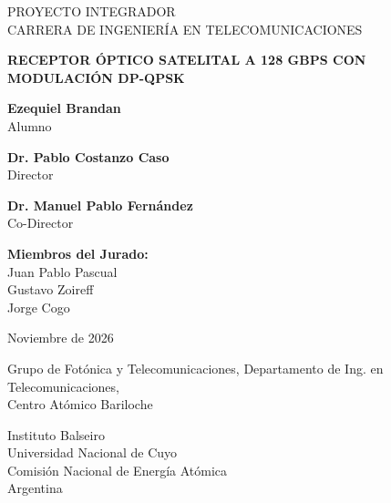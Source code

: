 %
\begin{titlepage}
\centering
\setlength{\parskip}{0pt}
\vspace*{1cm}

{\large PROYECTO INTEGRADOR}\\[0.3cm]
{\large CARRERA DE INGENIER\'IA EN TELECOMUNICACIONES}


{\LARGE\bfseries RECEPTOR \'OPTICO SATELITAL A 128 GBPS CON MODULACI\'ON DP-QPSK\\}


{\large\bfseries Ezequiel Brandan}\\
{\normalsize Alumno}


\begin{minipage}{0.45\textwidth}\centering
{\bfseries {Dr. Pablo Costanzo Caso}}\\
Director
\end{minipage}
\begin{minipage}{0.45\textwidth}\centering
{\bfseries {Dr. Manuel Pablo Fern\'andez}}\\
Co-Director
\end{minipage}


{\bfseries Miembros del Jurado:}\\
{Juan Pablo Pascual}\\
{Gustavo Zoireff}\\
{Jorge Cogo}


{\normalsize Noviembre de 2026}


{\normalsize Grupo de Fot\'onica y Telecomunicaciones, Departamento de Ing. en Telecomunicaciones,\\
Centro At\'omico Bariloche}


{\normalsize Instituto Balseiro\\
Universidad Nacional de Cuyo\\
Comisi\'on Nacional de Energ\'ia At\'omica\\
Argentina}

\end{titlepage}
\cleardoublepage


